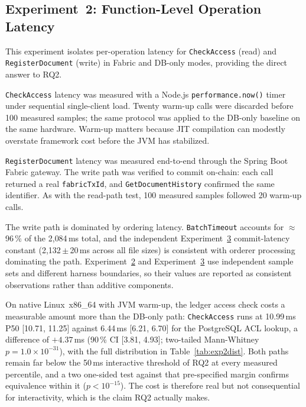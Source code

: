 \documentclass[preprint,12pt]{elsarticle}
\begin{document}
\subsection{Experiment~2: Function-Level Operation Latency}
\label{sec:exp_latency}

This experiment isolates per-operation latency for \texttt{CheckAccess}
(read) and \texttt{RegisterDocument} (write) in Fabric and DB-only modes,
providing the direct answer to RQ2.

\texttt{CheckAccess} latency was measured with a Node.js
\texttt{performance.now()} timer under sequential single-client load. Twenty
warm-up calls were discarded before 100 measured samples; the same protocol
was applied to the DB-only baseline on the same hardware. Warm-up matters
because JIT compilation can modestly overstate framework cost before the JVM
has stabilized.

\texttt{RegisterDocument} latency was measured end-to-end through the
Spring Boot Fabric gateway. The write path was verified to commit on-chain:
each call returned a real \texttt{fabricTxId}, and \texttt{GetDocumentHistory}
confirmed the same identifier. As with the read-path test, 100 measured
samples followed 20 warm-up calls.

The write path is dominated by ordering latency. \texttt{BatchTimeout}
accounts for $\approx$96\,\% of the 2{,}084\,ms total, and the independent
Experiment~\hyperref[sec:exp_filesize]{3} commit-latency constant (2{,}132\,$\pm$\,20\,ms across all
file sizes) is consistent with orderer processing dominating the path.
Experiment~\hyperref[sec:exp_latency]{2} and Experiment~\hyperref[sec:exp_filesize]{3} use independent sample sets and different
harness boundaries, so their values are reported as consistent observations
rather than additive components.

On native Linux~x86\_64 with JVM warm-up, the ledger access check costs a
measurable amount more than the DB-only path: \texttt{CheckAccess} runs at
10.99\,ms P50 [10.71, 11.25] against 6.44\,ms [6.21, 6.70] for the
PostgreSQL ACL lookup, a difference of $+4.37$\,ms (90\,\% CI [3.81, 4.93];
two-tailed Mann-Whitney $p = 1.0 \times 10^{-31}$), with the full
distribution in Table~\ref{tab:exp2dist}. Both paths remain far below the
50\,ms interactive threshold of RQ2 at every measured percentile, and a
two one-sided test against that pre-specified margin confirms equivalence
within it ($p < 10^{-15}$). The cost is therefore real but not
consequential for interactivity, which is the claim RQ2 actually makes.
\end{document}

